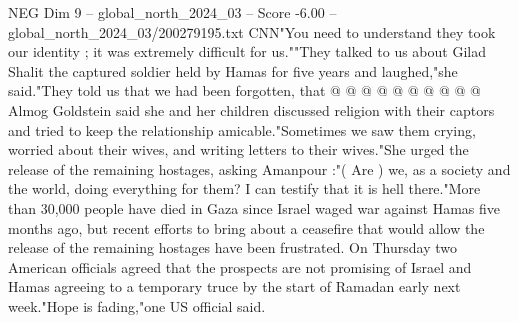 \begin{textsample}{NEG Dim 9 – global\_north\_2024\_03 – Score -6.00 – global\_north\_2024\_03/200279195.txt}
CNN"You need to understand they took our identity ; it was extremely difficult for us.""They talked to us about Gilad Shalit the captured soldier held by Hamas for five years and laughed,"she said."They told us that we had been forgotten, that @ @ @ @ @ @ @ @ @ @ Almog Goldstein said she and her children discussed religion with their captors and tried to keep the relationship amicable."Sometimes we saw them crying, worried about their wives, and writing letters to their wives."She urged the release of the remaining hostages, asking Amanpour :"( Are ) we, as a society and the world, doing everything for them?
I can testify that it is hell there."More than 30,000 people have died in Gaza since Israel waged war against Hamas five months ago, but recent efforts to bring about a ceasefire that would allow the release of the remaining hostages have been frustrated.
On Thursday two American officials agreed that the prospects are not promising of Israel and Hamas agreeing to a temporary truce by the start of Ramadan early next week."Hope is fading,"one US official said.

\end{textsample}
